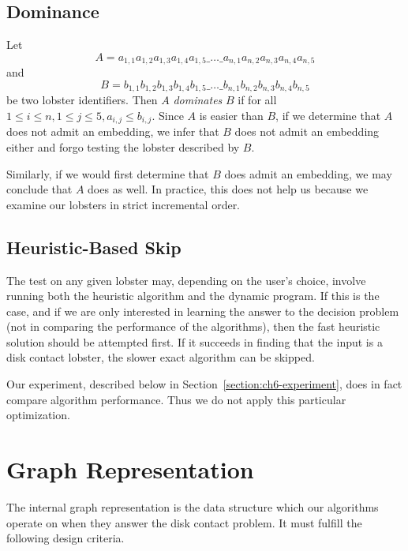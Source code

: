 \subsection{Dominance}

Let $$A = a_{1,1}a_{1,2}a_{1,3}a_{1,4}a_{1,5}\_\ldots\_a_{n,1}a_{n,2}a_{n,3}a_{n,4}a_{n,5}$$ and $$B = b_{1,1}b_{1,2}b_{1,3}b_{1,4}b_{1,5}\_\ldots\_b_{n,1}b_{n,2}b_{n,3}b_{n,4}b_{n,5}$$ be two lobster identifiers. Then $A$ \emph{dominates} $B$ if for all $1 \leq i \leq n, 1 \leq j \leq 5, a_{i,j} \leq b_{i,j}$. Since $A$ is easier than $B$, if we determine that $A$ does not admit an embedding, we infer that $B$ does not admit an embedding either and forgo testing the lobster described by $B$.

Similarly, if we would first determine that $B$ does admit an embedding, we may conclude that $A$ does as well. In practice, this does not help us because we examine our lobsters in strict incremental order.

\subsection{Heuristic-Based Skip}

The test on any given lobster may, depending on the user's choice, involve running both the heuristic algorithm and the dynamic program. If this is the case, and if we are only interested in learning the answer to the decision problem (not in comparing the performance of the algorithms), then the fast heuristic solution should be attempted first. If it succeeds in finding that the input is a disk contact lobster, the slower exact algorithm can be skipped.

Our experiment, described below in Section~\ref{section:ch6-experiment}, does in fact compare algorithm performance. Thus we do not apply this particular optimization.

\section{Graph Representation}
\label{section:ch6-graph-representation}

The internal graph representation is the data structure which our algorithms operate on when they answer the disk contact problem. It must fulfill the following design criteria.

